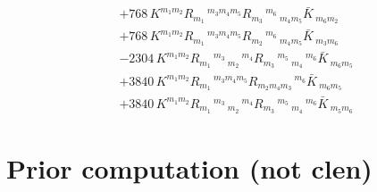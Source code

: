 \begin{align}
  &+768\,K^{{m_{1}} {m_{2}}} R_{{m_{1}}}\,^{{m_{3}} {m_{4}} {m_{5}}} R_{{m_{3}}}\,^{{m_{6}}}\,_{{m_{4}} {m_{5}}} \bar{K}\,_{{m_{6}} {m_{2}}}\\
  &+768\,K^{{m_{1}} {m_{2}}} R_{{m_{1}}}\,^{{m_{3}} {m_{4}} {m_{5}}} R_{{m_{2}}}\,^{{m_{6}}}\,_{{m_{4}} {m_{5}}} \bar{K}\,_{{m_{3}} {m_{6}}}\\
  &-2304\,K^{{m_{1}} {m_{2}}} R_{{m_{1}}}\,^{{m_{3}}}\,_{{m_{2}}}\,^{{m_{4}}} R_{{m_{3}}}\,^{{m_{5}}}\,_{{m_{4}}}\,^{{m_{6}}} \bar{K}\,_{{m_{6}} {m_{5}}}\\
  &+3840\,K^{{m_{1}} {m_{2}}} R_{{m_{1}}}\,^{{m_{3}} {m_{4}} {m_{5}}} R_{{m_{2}} {m_{4}} {m_{3}}}\,^{{m_{6}}} \bar{K}\,_{{m_{6}} {m_{5}}}\\
  &+3840\,K^{{m_{1}} {m_{2}}} R_{{m_{1}}}\,^{{m_{3}}}\,_{{m_{2}}}\,^{{m_{4}}} R_{{m_{3}}}\,^{{m_{5}}}\,_{{m_{4}}}\,^{{m_{6}}} \bar{K}\,_{{m_{5}} {m_{6}}}
\end{align}

\section{Prior computation (not clen)}

